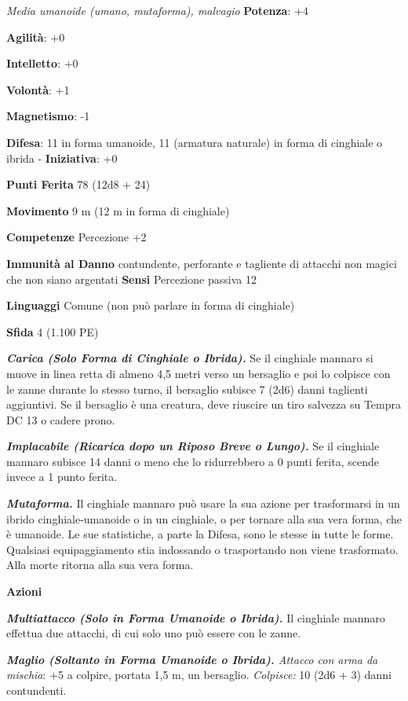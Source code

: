 \begin{multicols}{2}
\emph{Media umanoide (umano, mutaforma), malvagio}
\textbf{Potenza}: +4

\textbf{Agilità}: +0

\textbf{Intelletto}: +0

\textbf{Volontà}: +1

\textbf{Magnetismo}: -1

\textbf{Difesa}: 11 in forma umanoide, 11 (armatura naturale) in
forma di cinghiale o ibrida  - \textbf{Iniziativa}: +0

\textbf{Punti Ferita} 78 (12d8 + 24)

\textbf{Movimento} 9 m (12 m in forma di cinghiale)

\textbf{Competenze} Percezione +2

\textbf{Immunità al Danno} contundente, perforante e tagliente di
attacchi non magici che non siano argentati \textbf{Sensi} Percezione
passiva 12

\textbf{Linguaggi} Comune (non può parlare in forma di cinghiale)

\textbf{Sfida} 4 (1.100 PE)

\emph{\textbf{Carica (Solo Forma di Cinghiale o Ibrida).}} Se il
cinghiale mannaro si muove in linea retta di almeno 4,5 metri verso un
bersaglio e poi lo colpisce con le zanne durante lo stesso turno, il
bersaglio subisce 7 (2d6) danni taglienti aggiuntivi. Se il bersaglio è
una creatura, deve riuscire un tiro salvezza su Tempra DC 13 o cadere
prono.

\emph{\textbf{Implacabile (Ricarica dopo un Riposo Breve o Lungo).}} Se
il cinghiale mannaro subisce 14 danni o meno che lo ridurrebbero a 0
punti ferita, scende invece a 1 punto ferita.

\emph{\textbf{Mutaforma.}} Il cinghiale mannaro può usare la sua azione
per trasformarsi in un ibrido cinghiale-umanoide o in un cinghiale, o
per tornare alla sua vera forma, che è umanoide. Le sue statistiche, a
parte la Difesa, sono le stesse in tutte le forme. Qualsiasi equipaggiamento
stia indossando o trasportando non viene trasformato. Alla morte ritorna
alla sua vera forma.

\textbf{Azioni}

\emph{\textbf{Multiattacco (Solo in Forma Umanoide o Ibrida).}} Il
cinghiale mannaro effettua due attacchi, di cui solo uno può essere con
le zanne.

\emph{\textbf{Maglio (Soltanto in Forma Umanoide o Ibrida).} Attacco con
arma da mischia}: +5 a colpire, portata 1,5 m, un bersaglio.
\emph{Colpisce:} 10 (2d6 + 3) danni contundenti.


\end{multicols}
